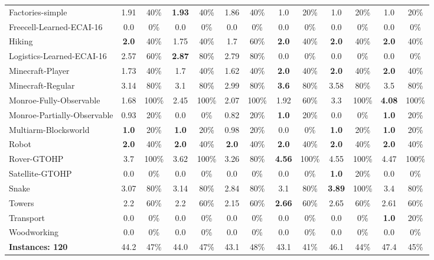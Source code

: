 \begin{table}
\begin{adjustbox}{angle=90}
\begin{tabular}{|l|cc|cc|cc|cc|cc|cc|}
		Factories-simple & 1.91 & 40\%  & \textbf{1.93} & 40\%  & 1.86 & 40\%  & 1.0 & 20\%  & 1.0 & 20\%  & 1.0 & 20\%  \\
		Freecell-Learned-ECAI-16 & 0.0 & 0\%  & 0.0 & 0\%  & 0.0 & 0\%  & 0.0 & 0\%  & 0.0 & 0\%  & 0.0 & 0\%  \\
		Hiking & \textbf{2.0} & 40\%  & 1.75 & 40\%  & 1.7 & 60\%  & \textbf{2.0} & 40\%  & \textbf{2.0} & 40\%  & \textbf{2.0} & 40\%  \\
		Logistics-Learned-ECAI-16 & 2.57 & 60\%  & \textbf{2.87} & 80\%  & 2.79 & 80\%  & 0.0 & 0\%  & 0.0 & 0\%  & 0.0 & 0\%  \\
		Minecraft-Player & 1.73 & 40\%  & 1.7 & 40\%  & 1.62 & 40\%  & \textbf{2.0} & 40\%  & \textbf{2.0} & 40\%  & \textbf{2.0} & 40\%  \\
		Minecraft-Regular & 3.14 & 80\%  & 3.1 & 80\%  & 2.99 & 80\%  & \textbf{3.6} & 80\%  & 3.58 & 80\%  & 3.5 & 80\%  \\
		Monroe-Fully-Observable & 1.68 & 100\%  & 2.45 & 100\%  & 2.07 & 100\%  & 1.92 & 60\%  & 3.3 & 100\%  & \textbf{4.08} & 100\%  \\
		Monroe-Partially-Observable & 0.93 & 20\%  & 0.0 & 0\%  & 0.82 & 20\%  & \textbf{1.0} & 20\%  & 0.0 & 0\%  & \textbf{1.0} & 20\%  \\
		Multiarm-Blocksworld & \textbf{1.0} & 20\%  & \textbf{1.0} & 20\%  & 0.98 & 20\%  & 0.0 & 0\%  & \textbf{1.0} & 20\%  & \textbf{1.0} & 20\%  \\
		Robot & \textbf{2.0} & 40\%  & \textbf{2.0} & 40\%  & \textbf{2.0} & 40\%  & \textbf{2.0} & 40\%  & \textbf{2.0} & 40\%  & \textbf{2.0} & 40\%  \\
		Rover-GTOHP & 3.7 & 100\%  & 3.62 & 100\%  & 3.26 & 80\%  & \textbf{4.56} & 100\%  & 4.55 & 100\%  & 4.47 & 100\%  \\
		Satellite-GTOHP & 0.0 & 0\%  & 0.0 & 0\%  & 0.0 & 0\%  & 0.0 & 0\%  & \textbf{1.0} & 20\%  & 0.0 & 0\%  \\
		Snake & 3.07 & 80\%  & 3.14 & 80\%  & 2.84 & 80\%  & 3.1 & 80\%  & \textbf{3.89} & 100\%  & 3.4 & 80\%  \\
		Towers & 2.2 & 60\%  & 2.2 & 60\%  & 2.15 & 60\%  & \textbf{2.66} & 60\%  & 2.65 & 60\%  & 2.61 & 60\%  \\
		Transport & 0.0 & 0\%  & 0.0 & 0\%  & 0.0 & 0\%  & 0.0 & 0\%  & 0.0 & 0\%  & \textbf{1.0} & 20\%  \\
		Woodworking & 0.0 & 0\%  & 0.0 & 0\%  & 0.0 & 0\%  & 0.0 & 0\%  & 0.0 & 0\%  & 0.0 & 0\%  \\
		\hline
		\textbf{Instances: 120} & 44.2 & 47\% & 44.0 & 47\% & 43.1 & 48\% & 43.1 & 41\% & 46.1 & 44\% & 47.4 & 45\% \\
		\hline
	\end{tabular}

	\end{adjustbox}
\end{table}
